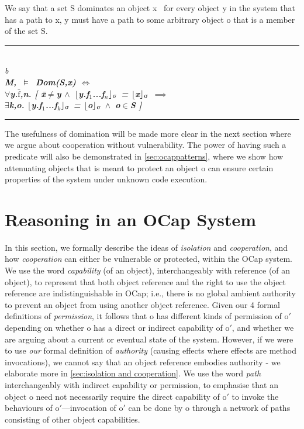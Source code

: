 \documentclass[a4paper,11pt,twoside]{article}
\makeatletter
\newenvironment{logic}
{\begin{minipage}[c]{\linewidth}  \sffamily \mdseries \begin{tabbing}}
{\end{tabbing}\end{minipage}\vspace{0.3em}}
\newcommand{\loin}{$\in$}
\newcommand{\loforall}{$\forall$}
\newcommand{\loexists}{$\exists$}
\newcommand{\loand}{$\land$}
\newcommand{\loneq} {$\neq$}
\newcommand{\loimplies}{$\implies$}
\newcommand{\losigma}{\text{$\upsigma$}}
\newcommand{\loturns} {$\vDash$}
\newcommand{\loiff} {$\iff$}
\newcommand{\loexec}[2] {$\lfloor$#1$\rfloor _{\text{#2}}$}
\newcommand{\loconj}[1] {$\bar{\text{#1}}$}
\newcommand{\lotiff} {\textit{\textls[-20]{iff}}}
\newcommand{\hr}{\rule{\linewidth}{0.4pt}}
\DeclareRobustCommand{\emp}{%
  \@nomath\em \if b\expandafter\@car\f@series\@nil
  \normalfont \else \sffamily \bfseries \fi}
\makeatother
\begin{document}
We say that a set S dominates an object x \lotiff\ for every object y in the system that has a path to x, y must have a path to some arbitrary object o that is a member of the set S. 

\begin{logic}
\hr\\
\emp{Definition---[Domination]}\\
M,\losigma\ \loturns\ \=Dom(S,x) \loiff \\
\> \loforall y.\loconj{f},n. [ \= x\loneq y \loand\ \loexec{y.f$_1$...f$_n$}{\losigma} = \loexec{x}{\losigma} \loimplies\\
\>\> \loexists k,o. \loexec{y.f$_1$...f$_k$}{\losigma} = \loexec{o}{\losigma} \loand\ o\loin S ]\\
\hr
\end{logic}
The usefulness of domination will be made more clear in the next section where we argue about cooperation without vulnerability. The power of having such a predicate will also be demonstrated in \cref{sec:ocappatterns}, where we show how attenuating objects that is meant to protect an object o can ensure certain properties of the system under unknown code execution.\\
\section{Reasoning in an OCap System}\label{sec:ocapreasoning}

In this section, we formally describe the ideas of \textit{isolation} and \textit{cooperation}, and how \textit{cooperation} can either be vulnerable or protected, within the OCap system. We use the word \textit{capability} (of an object), interchangeably with reference (of an object), to represent that both object reference and the right to use the object reference are indistinguishable in OCap; i.e., there is no global ambient authority to prevent an object from using another object reference. Given our 4 formal definitions of \textit{permission}, it follows that o has different kinds of permission of o$'$ depending on whether o has a direct or indirect capability of o$'$, and whether we are arguing about a current or eventual state of the system. However, if we were to use \textit{our} formal definition of \textit{authority} (causing effects where effects are method invocations), we cannot say that an object reference embodies authority - we elaborate more in \cref{sec:isolation and cooperation}. We use the word \textit{path} interchangeably with indirect capability or permission, to emphasise that an object o need not necessarily require the direct capability of o$'$ to invoke the behaviours of o$'$---invocation of o$'$ can be done by o through a network of paths consisting of other object capabilities.\\
\end{document}
